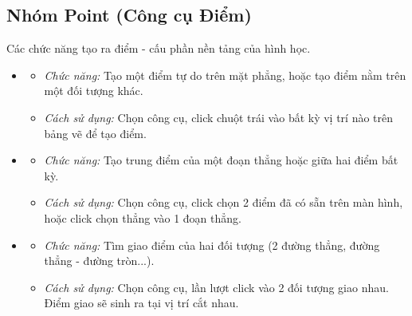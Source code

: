 \documentclass[12pt,a4paper]{article}
\begin{document}
\subsection{Nhóm Point (Công cụ Điểm)}
Các chức năng tạo ra điểm - cấu phần nền tảng của hình học.
\begin{itemize}[label=\textcolor{primary}{\faCircle}]
    \item {}
    \begin{itemize}
        \item \textit{Chức năng:} Tạo một điểm tự do trên mặt phẳng, hoặc tạo điểm nằm trên một đối tượng khác.
        \item \textit{Cách sử dụng:} Chọn công cụ, click chuột trái vào bất kỳ vị trí nào trên bảng vẽ để tạo điểm.
    \end{itemize}

    \item {}
    \begin{itemize}
        \item \textit{Chức năng:} Tạo trung điểm của một đoạn thẳng hoặc giữa hai điểm bất kỳ.
        \item \textit{Cách sử dụng:} Chọn công cụ, click chọn 2 điểm đã có sẵn trên màn hình, hoặc click chọn thẳng vào 1 đoạn thẳng.
    \end{itemize}

    \item {}
    \begin{itemize}
        \item \textit{Chức năng:} Tìm giao điểm của hai đối tượng (2 đường thẳng, đường thẳng - đường tròn...).
        \item \textit{Cách sử dụng:} Chọn công cụ, lần lượt click vào 2 đối tượng giao nhau. Điểm giao sẽ sinh ra tại vị trí cắt nhau.
    \end{itemize}
\end{itemize}
\end{document}
